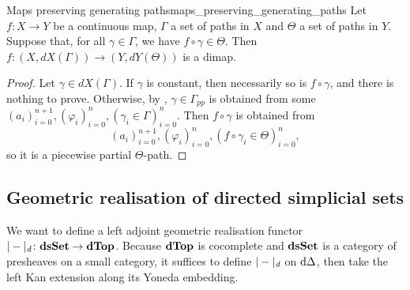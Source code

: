 \begin{clem}{Maps preserving generating paths}{maps_preserving_generating_paths}
Let \( f\colon X \to Y \) be a continuous map, \( \Gamma \) a set of paths in \( X \) and \( \Theta \) a set of paths in \( Y \).
Suppose that, for all \( \gamma \in \Gamma \), we have \( f \circ \gamma \in \Theta \).
Then \( f\colon (X, dX(\Gamma)) \to (Y, dY(\Theta)) \) is a dimap.
\end{clem}
\begin{proof}
Let \( \gamma \in dX(\Gamma) \).
If \( \gamma \) is constant, then necessarily so is \( f \circ \gamma \), and there is nothing to prove.
Otherwise, by , \( \gamma \in \Gamma_\textit{pp} \) is obtained from some \( (a_i)_{i=0}^{n+1}, (\varphi_i)_{i=0}^n, (\gamma_i \in \Gamma)_{i=0}^n \).
Then \( f \circ \gamma \) is obtained from
\begin{equation*}
	(a_i)_{i=0}^{n+1}, (\varphi_i)_{i=0}^n, (f \circ \gamma_i \in \Theta)_{i=0}^n, 
\end{equation*}
so it is a piecewise partial \( \Theta \)-path.
\end{proof}


\subsection{Geometric realisation of directed simplicial sets}

We want to define a left adjoint geometric realisation functor \( |-|_\textit{d}\colon \mathbf{dsSet} \to \mathbf{dTop} \).
Because \( \mathbf{dTop} \) is cocomplete and \( \mathbf{dsSet} \) is a category of presheaves on a small category, it suffices to define \( |-|_\textit{d} \) on \( \mathrm{d}\Delta \), then take the left Kan extension along its Yoneda embedding.

